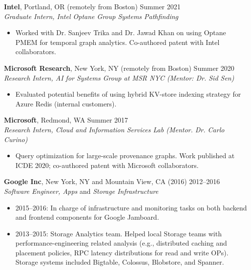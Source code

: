 \documentclass[centered,overlapped]{res}
\begin{document}
\begin{resume}
  \textbf{Intel}, Portland, OR (remotely from Boston) \hfill Summer 2021 \\
  {\sl Graduate Intern, Intel Optane Group Systems Pathfinding}
  \begin{itemize}
  \item Worked with Dr. Sanjeev Trika and Dr. Jawad Khan on using Optane PMEM for temporal graph analytics. Co-authored patent with Intel collaborators.
  \end{itemize}

  \textbf{Microsoft Research}, New York, NY (remotely from Boston) \hfill Summer 2020 \\
  {\sl Research Intern, AI for Systems Group at MSR NYC (Mentor: Dr. Sid Sen)}
  \begin{itemize}
  \item Evaluated potential benefits of using hybrid KV-store indexing strategy for Azure Redis (internal customers).
  \end{itemize}

  \textbf{Microsoft}, Redmond, WA \hfill Summer 2017 \\
  {\sl Research Intern, Cloud and Information Services Lab (Mentor. Dr. Carlo Curino)}
  \begin{itemize}
  \item Query optimization for large-scale provenance graphs. Work published at ICDE 2020; co-authored patent with Microsoft collaborators.
  \end{itemize}

  \textbf{Google Inc}, New York, NY and Mountain View, CA (2016) \hfill 2012--2016 \\
  {\sl Software Engineer, Apps} and {\sl Storage Infrastructure}
  \begin{itemize}  \itemsep -2pt
  \item  2015--2016: In charge of infrastructure and monitoring tasks on both backend and frontend components for Google Jamboard.
  \item  2013--2015: Storage Analytics team. Helped local Storage teams with performance-engineering related analysis (e.g., distributed caching and placement policies, RPC latency distributions for read and write OPs). Storage systems included Bigtable, Colossus, Blobstore, and Spanner.
  \end{itemize}


\end{resume}
\end{document}
